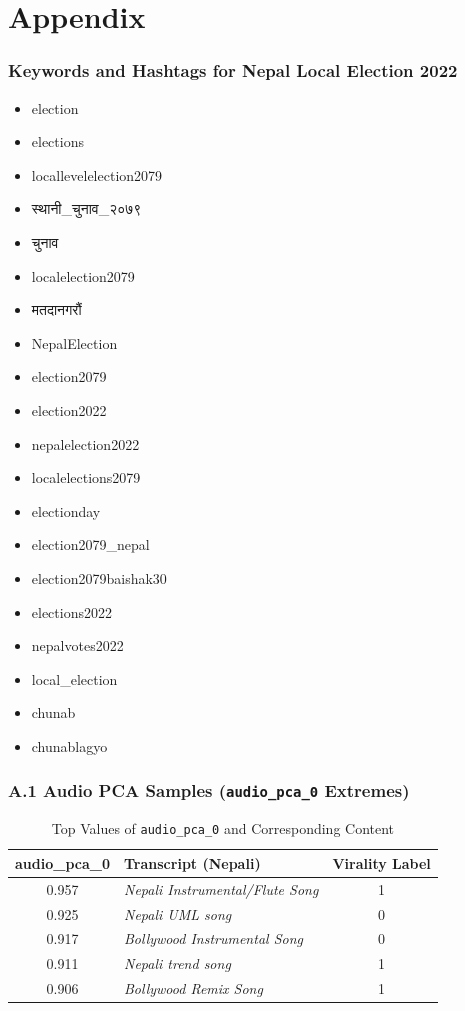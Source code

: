 \documentclass[12pt,a4paper]{report}
\begin{document}
\clearpage
{} %
\chapter{Appendix}

{}
\subsection*{Keywords and Hashtags for Nepal Local Election 2022}
\label{appendix:keywords}
\begin{itemize}
    \item election
    \item elections
    \item locallevelelection2079
    \item \texthindi{स्थानी\_चुनाव\_२०७९}
    \item \texthindi{चुनाव}
    \item localelection2079
    \item \texthindi{मतदानगरौं}
    \item NepalElection
    \item election2079
    \item election2022
    \item nepalelection2022
    \item localelections2079
    \item electionday
    \item election2079\_nepal
    \item election2079baishak30
    \item elections2022
    \item nepalvotes2022
    \item local\_election
    \item chunab
    \item chunablagyo
\end{itemize}

\subsection*{A.1 Audio PCA Samples (\texttt{audio\_pca\_0} Extremes)}

\begin{table}[H]
\centering
\caption{Top Values of \texttt{audio\_pca\_0} and Corresponding Content}
\label{tab:audio_pca_high}
\begin{tabular}{clc}
\toprule
\textbf{audio\_pca\_0} & \textbf{Transcript (Nepali)} & \textbf{Virality Label} \\
\midrule
0.957 & \textit{Nepali Instrumental/Flute Song} & 1 \\
0.925 & \textit{Nepali UML song} & 0 \\
0.917 & \textit{Bollywood Instrumental Song} & 0 \\
0.911 & \textit{Nepali trend song} & 1 \\
0.906 & \textit{Bollywood Remix Song} & 1 \\
\bottomrule
\end{tabular}
\end{table}
\end{document}
